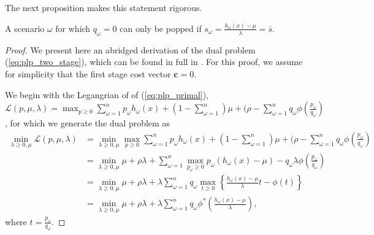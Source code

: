 \documentclass[ijoc,letterpaper]{informs3} %
\renewcommand{\c}{\mathbf{c}}
\begin{document}
The next proposition makes this statement rigorous.

\begin{proposition} \label{prop:pop}
	A scenario $\omega$ for which $q_\omega = 0$ can only be popped if $s_\omega = \frac{h_\omega(x) - \mu}{\lambda} = \bar{s}$.
\end{proposition}

\begin{proof}
	We present here an abridged derivation of the dual problem (\ref{eq:plp_two_stage}), which can be found in full in \cite{bental2011robust}.
	For this proof, we assume for simplicity that the first stage cost vector $\c = 0$.
	
	We begin with the Legangrian of of (\ref{eq:plp_primal}), $\mathcal{L}(p,\mu,\lambda) = \max_{p \geq 0} \sum_{\omega=1}^n p_\omega h_\omega(x) + (1-\sum_{\omega=1}^n)\mu + (\rho - \sum_{\omega=1}^n q_\omega \phi\left(\frac{p_\omega}{q_\omega}\right)$, for which we generate the dual problem as
	\begin{align}
		\min_{\lambda \geq 0, \mu} \mathcal{L}(p,\mu,\lambda) & = \min_{\lambda \geq 0, \mu} \max_{p \geq 0} \sum_{\omega=1}^n p_\omega h_\omega(x) + (1-\sum_{\omega=1}^n)\mu + (\rho - \sum_{\omega=1}^n q_\omega \phi\left(\frac{p_\omega}{q_\omega}\right) \nonumber \\
		& = \min_{\lambda \geq 0, \mu} \mu + \rho\lambda + \sum_{\omega=1}^n \max_{p_\omega \geq 0} p_\omega (h_\omega(x) - \mu) - q_\omega \lambda \phi\left(\frac{p_\omega}{q_\omega}\right) \label{eq:pop_proof_detail_1} \\
		& = \min_{\lambda \geq 0, \mu} \mu + \rho\lambda + \lambda \sum_{\omega=1}^n q_\omega \max_{t \geq 0} \left\{ \frac{h_\omega(x) - \mu}{\lambda} t - \phi(t) \right\} \label{eq:pop_proof_detail_2} \\
		& = \min_{\lambda \geq 0, \mu} \mu + \rho\lambda + \lambda \sum_{\omega=1}^n q_\omega \phi^*\left(\frac{h_\omega(x) - \mu}{\lambda}\right), \nonumber
	\end{align}
	where $t = \frac{p_\omega}{q_\omega}$.
	

\end{proof}
\end{document}
